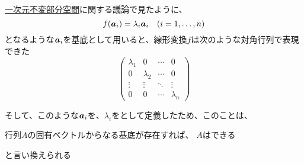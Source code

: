\documentclass[../../../topic_linear-algebra]{subfiles}
\begin{document}
\hyperref[sec:1d-invariant-subspaces]{一次元不変部分空間}に関する議論で見たように、
\begin{equation*}
  f(\vb*{a}_i) = \lambda_i \vb*{a}_i \quad (i = 1, \dots, n)
\end{equation*}
となるような$\vb*{a}_i$を基底として用いると、線形変換$f$は次のような対角行列で表現できた
\begin{equation*}
  \begin{pmatrix}
    \lambda_1 & 0         & \cdots & 0         \\
    0         & \lambda_2 & \cdots & 0         \\
    \vdots    & \vdots    & \ddots & \vdots    \\
    0         & 0         & \cdots & \lambda_n
  \end{pmatrix}
\end{equation*}

そして、このような$\vb*{a}_i$を、$\lambda_i$をとして定義したため、このことは、
\begin{shaded}
  行列$A$の固有ベクトルからなる基底が存在すれば、
  $A$はできる
\end{shaded}
と言い換えられる
\end{document}
